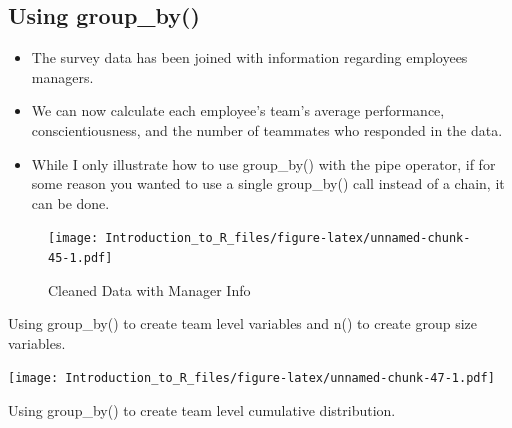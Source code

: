 \documentclass[]{book}
\newenvironment{Shaded}{\begin{snugshade}}{\end{snugshade}}
\newcommand{\DataTypeTok}[1]{\textcolor[rgb]{0.13,0.29,0.53}{#1}}
\newcommand{\KeywordTok}[1]{\textcolor[rgb]{0.13,0.29,0.53}{\textbf{#1}}}
\newcommand{\NormalTok}[1]{#1}
\newcommand{\OperatorTok}[1]{\textcolor[rgb]{0.81,0.36,0.00}{\textbf{#1}}}
\newcommand{\OtherTok}[1]{\textcolor[rgb]{0.56,0.35,0.01}{#1}}
\newcommand{\StringTok}[1]{\textcolor[rgb]{0.31,0.60,0.02}{#1}}
\providecommand{\tightlist}{%
  \setlength{\itemsep}{0pt}\setlength{\parskip}{0pt}}
\theoremstyle{definition}
\theoremstyle{definition}
\theoremstyle{definition}
\theoremstyle{remark}
\let\BeginKnitrBlock\begin \let\EndKnitrBlock\end
\begin{document}
\hypertarget{using-group_by}{%
\subsection{Using group\_by()}\label{using-group_by}}

\begin{itemize}
\tightlist
\item
  The survey data has been joined with information regarding employees managers.
\item
  We can now calculate each employee's team's average performance, conscientiousness, and the number of teammates who responded in the data.
\item
  While I only illustrate how to use group\_by() with the pipe operator, if for some reason you wanted to use a single group\_by() call instead of a chain, it can be done.
\end{itemize}

\begin{figure}
\centering
\texttt{[image: Introduction\_to\_R\_files/figure-latex/unnamed-chunk-45-1.pdf]}
\caption{\label{fig:unnamed-chunk-45}Cleaned Data with Manager Info}
\end{figure}

\BeginKnitrBlock{example}
\protect\hypertarget{exm:groupby1}{}{\label{exm:groupby1} }Using group\_by() to create team level variables and n() to create group size variables.
\EndKnitrBlock{example}

\begin{Shaded}
\end{Shaded}

\texttt{[image: Introduction\_to\_R\_files/figure-latex/unnamed-chunk-47-1.pdf]}
\BeginKnitrBlock{example}
\protect\hypertarget{exm:groupby2}{}{\label{exm:groupby2} }Using group\_by() to create team level cumulative distribution.
\EndKnitrBlock{example}

\begin{Shaded}
\end{Shaded}
\end{document}
